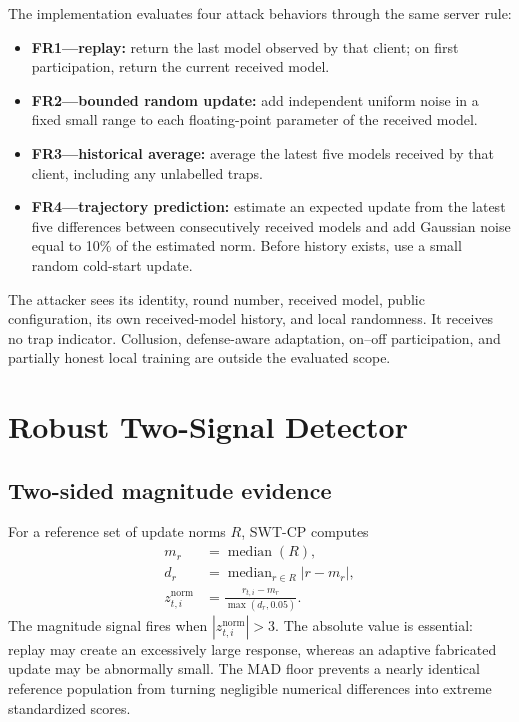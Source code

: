The implementation evaluates four attack behaviors through the same server rule:
\begin{itemize}
    \item \textbf{FR1---replay:} return the last model observed by that client; on first participation, return the current received model.
    \item \textbf{FR2---bounded random update:} add independent uniform noise in a fixed small range to each floating-point parameter of the received model.
    \item \textbf{FR3---historical average:} average the latest five models received by that client, including any unlabelled traps.
    \item \textbf{FR4---trajectory prediction:} estimate an expected update from the latest five differences between consecutively received models and add Gaussian noise equal to 10\% of the estimated norm. Before history exists, use a small random cold-start update.
\end{itemize}
The attacker sees its identity, round number, received model, public configuration, its own received-model history, and local randomness. It receives no trap indicator. Collusion, defense-aware adaptation, on--off participation, and partially honest local training are outside the evaluated scope.

\section{Robust Two-Signal Detector}

\subsection{Two-sided magnitude evidence}
For a reference set of update norms $R$, SWT-CP computes
\begin{align}
m_r &= \operatorname{median}(R),\\
d_r &= \operatorname{median}_{r\in R}|r-m_r|,\\
z^{\mathrm{norm}}_{t,i} &= \frac{r_{t,i}-m_r}{\max(d_r,0.05)}.
\end{align}
The magnitude signal fires when $|z^{\mathrm{norm}}_{t,i}|>3$. The absolute value is essential: replay may create an excessively large response, whereas an adaptive fabricated update may be abnormally small. The MAD floor prevents a nearly identical reference population from turning negligible numerical differences into extreme standardized scores.

